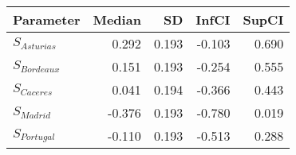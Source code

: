 \begin{table}[ht]
\centering
\begin{tabular}{lrrrr}
  \hline
Parameter & Median & SD & InfCI & SupCI \\ 
  \hline
$S_{Asturias}$ & 0.292 & 0.193 & -0.103 & 0.690 \\ 
  $S_{Bordeaux}$ & 0.151 & 0.193 & -0.254 & 0.555 \\ 
  $S_{Caceres}$ & 0.041 & 0.194 & -0.366 & 0.443 \\ 
  $S_{Madrid}$ & -0.376 & 0.193 & -0.780 & 0.019 \\ 
  $S_{Portugal}$ & -0.110 & 0.193 & -0.513 & 0.288 \\ 
   \hline
\end{tabular}
\end{table}
